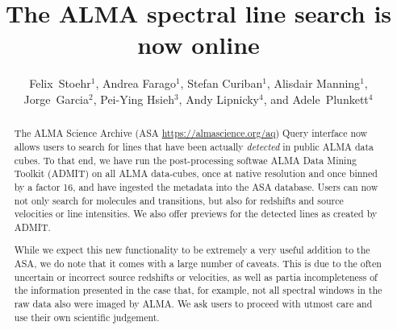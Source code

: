 \documentclass[11pt,twoside]{article}
\begin{document}
\title{The ALMA spectral line search is now online}

\author{Felix~Stoehr$^1$, Andrea Farago$^1$, Stefan Curiban$^1$, Alisdair Manning$^1$, Jorge~Garcia$^2$, Pei-Ying Hsieh$^3$, Andy Lipnicky$^4$, and Adele~Plunkett$^4$}



\begin{abstract}
The ALMA Science Archive (ASA \url{https://almascience.org/aq}) Query interface now allows users to search for lines that have been actually {\it detected} in public ALMA data cubes. To that end, we have run the post-processing softwae ALMA Data Mining Toolkit (ADMIT) \citep{admit} on all ALMA data-cubes, once at native resolution and once binned by a factor 16, and have ingested the metadata into the ASA database. Users can now not only search for molecules and transitions, but also for redshifts and source velocities or line intensities. We also offer previews for the detected lines as created by ADMIT.

While we expect this new functionality to be extremely a very useful addition to the ASA, we do note that it comes with a large number of caveats. This is due to the often uncertain or incorrect source redshifts or velocities, as well as partia incompleteness of the information presented in the case that, for example, not all spectral windows in the raw data also were imaged by ALMA. We ask users to proceed with utmost care and use their own scientific judgement.
\end{abstract}
\end{document}
